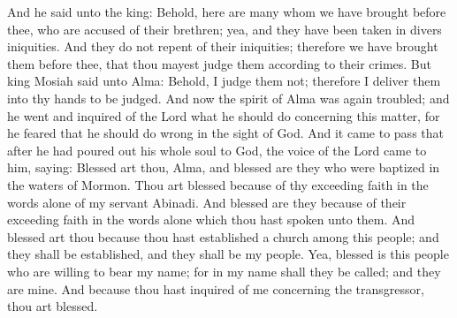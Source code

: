 And he said unto the king: Behold, here are many whom we have brought before thee, who are accused of their brethren; yea, and they have been taken in divers iniquities. And they do not repent of their iniquities; therefore we have brought them before thee, that thou mayest judge them according to their crimes.
\bverse \iffalse But king Mosiah said unto Alma: Behold, I judge them not; therefore I deliver them into thy hands to be judged. \fi
But king Mosiah said unto Alma: Behold, I judge them not; therefore I deliver them into thy hands to be judged.
\bverse \iffalse And now the spirit of Alma was again troubled; and he went and inquired of the Lord what he should do concerning this matter, for he feared that he should do wrong in the sight of God. \fi
And now the spirit of Alma was again troubled; and he went and inquired of the Lord what he should do concerning this matter, for he feared that he should do wrong in the sight of God.
\bverse \iffalse And it came to pass that after he had poured out his whole soul to God, the voice of the Lord came to him, saying: \fi
And it came to pass that after he had poured out his whole soul to God, the voice of the Lord came to him, saying:
\bverse \iffalse Blessed art thou, Alma, and blessed are they who were baptized in the waters of Mormon. Thou art blessed because of thy exceeding faith in the words alone of my servant Abinadi. \fi
Blessed art thou, Alma, and blessed are they who were baptized in the waters of Mormon. Thou art blessed because of thy exceeding faith in the words alone of my servant Abinadi.
\bverse \iffalse And blessed are they because of their exceeding faith in the words alone which thou hast spoken unto them. \fi
And blessed are they because of their exceeding faith in the words alone which thou hast spoken unto them.
\bverse \iffalse And blessed art thou because thou hast established a church among this people; and they shall be established, and they shall be my people. \fi
And blessed art thou because thou hast established a church among this people; and they shall be established, and they shall be my people.
\bverse \iffalse Yea, blessed is this people who are willing to bear my name; for in my name shall they be called; and they are mine. \fi
Yea, blessed is this people who are willing to bear my name; for in my name shall they be called; and they are mine.
\bverse \iffalse And because thou hast inquired of me concerning the transgressor, thou art blessed. \fi
And because thou hast inquired of me concerning the transgressor, thou art blessed.

